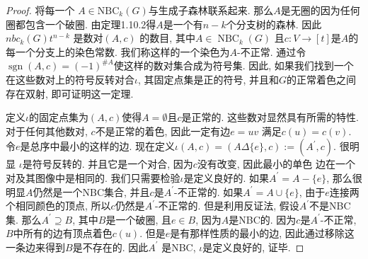 \documentclass[a4paper,12pt]{ctexbook}
\begin{document}
\begin{proof}
将每一个 $A \in \mathrm{NBC}_{k}(G)$与生成子森林联系起来. 那么$A$是无圈的因为任何圈都包含一个破圈. 由定理1.10.2得$A$是一个有$n-k$个分支树的森林. 因此$nbc_{k}(G) t^{n-k}$ 是数对$(A, c)$ 的数目, 其中$A \in \operatorname{NBC}_{k}(G)$ 且$c: V \rightarrow[t]$是$A$的每一个分支上的染色常数. 我们称这样的一个染色为$A$-不正常. 通过令 $\operatorname{sgn}(A, c)=(-1)^{\# A}$使这样的数对集合成为符号集. 因此, 如果我们找到一个在这些数对上的符号反转对合$\iota$, 其固定点集是正的符号, 并且和$G$的正常着色之间存在双射, 即可证明这一定理.

定义$\iota$的固定点集为$(A, c)$使得$A=\emptyset$且$c$是正常的. 这些数对显然具有所需的特性. 对于任何其他数对, $c$不是正常的着色, 因此一定有边$e=u v$ 满足$c(u)=c(v)$. 令$e$是总序中最小的这样的边. 现在定义$\iota(A, c)=(A \Delta\{e\}, c):=\left(A^{\prime}, c\right)$. 很明显 $\iota$是符号反转的. 并且它是一个对合, 因为$c$没有改变, 因此最小的单色
边在一个对及其图像中是相同的. 我们只需要检验$\iota$是定义良好的. 如果$A^{\prime}=A-\{e\}$, 那么很明显$A$仍然是一个NBC集合, 并且$c$是$A^{\prime}$-不正常的. 如果$A^{\prime}=A \cup\{e\}$, 由于$e$连接两个相同颜色的顶点, 所以$c$仍然是$A^{\prime}$-不正常的. 但是利用反证法, 假设$A^{\prime}$不是NBC集. 那么$A^{\prime} \supseteq B$, 其中$B$是一个破圈, 且$e \in B$, 因为$A$是NBC的. 因为$c$是$A^{\prime}$-不正常, $B$中所有的边有顶点着色$c(u)$. 但是$e$是有那样性质的最小的边, 因此通过移除这一条边来得到$B$是不存在的. 因此$A^{\prime}$ 是NBC, $\iota$是定义良好的, 证毕.
\end{proof}
\end{document}
